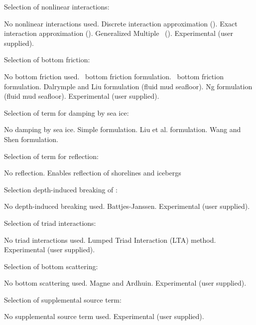 \noindent
Selection of nonlinear interactions:
\begin{slist}
 {No nonlinear interactions used.}
 {Discrete interaction approximation (\dia).}
 {Exact interaction approximation (\xnl).}
 {Generalized Multiple \dia\ (\gmd).}
 {Experimental (user supplied).}
\end{slist}

\noindent
Selection of bottom friction:
\begin{slist}
 {No bottom friction used.}
 {\js\ bottom friction formulation.}
 {\showex\ bottom friction formulation.}
 {Dalrymple and Liu formulation (fluid mud seafloor).}
 {Ng formulation (fluid mud seafloor).}
 {Experimental (user supplied).}
\end{slist}

\noindent
Selection of term for damping by sea ice:
\begin{slist}
 {No damping by sea ice.}
 {Simple formulation.}
 {Liu et al. formulation.}
 {Wang and Shen formulation.}
\end{slist}

\noindent
Selection of term for reflection:
\begin{slist}
 {No reflection.}
 {Enables reflection of shorelines and icebergs}
\end{slist}

\noindent
Selection depth-induced breaking of :
\begin{slist}
 {No depth-induced breaking used.}
 {Battjes-Janssen.}
 {Experimental (user supplied).}
\end{slist}

\noindent
Selection of triad interactions:
\begin{slist}
 {No triad interactions used.}
 {Lumped Triad Interaction (LTA) method.}
 {Experimental (user supplied).}
\end{slist}

\noindent
Selection of bottom scattering:
\begin{slist}
 {No bottom scattering used.}
 {Magne and Ardhuin.}
 {Experimental (user supplied).}
\end{slist}

\noindent
Selection of supplemental source term:
\begin{slist}
 {No supplemental source term used.}
 {Experimental (user supplied).}
\end{slist}

